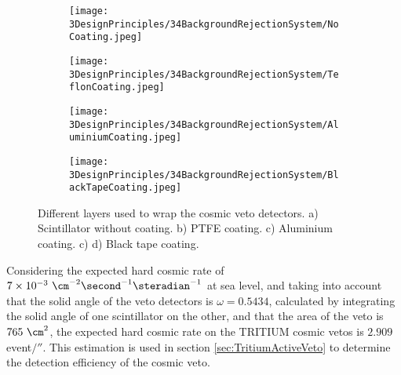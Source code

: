 \begin{figure}[h]
\centering
    \begin{subfigure}[b]{0.23\textwidth}
    \centering
    \texttt{[image: 3DesignPrinciples/34BackgroundRejectionSystem/NoCoating.jpeg]}  
    \caption{\label{subfig:PlasticScintillatorNoCoating}}
    \end{subfigure}
    \hfill
    \begin{subfigure}[b]{0.23\textwidth}
    \centering
    \texttt{[image: 3DesignPrinciples/34BackgroundRejectionSystem/TeflonCoating.jpeg]}  
    \caption{\label{subfig:PlasticScintillatorTeflon}}
    \end{subfigure}
    \hfill
    \begin{subfigure}[b]{0.23\textwidth}
    \centering
    \texttt{[image: 3DesignPrinciples/34BackgroundRejectionSystem/AluminiumCoating.jpeg]}  
    \caption{\label{subfig:PlasticScintillatorAluminium}}
    \end{subfigure}
    \hfill
    \begin{subfigure}[b]{0.23\textwidth}
    \centering
    \texttt{[image: 3DesignPrinciples/34BackgroundRejectionSystem/BlackTapeCoating.jpeg]}  
    \caption{\label{subfig:PlasticScintillatorBlackTape}}
    \end{subfigure}
 \caption{Different layers used to wrap the cosmic veto detectors. a) Scintillator without coating. b) PTFE coating. c) Aluminium coating. c) d) Black tape coating.}
 \label{fig:LayersVeto}
\end{figure}

Considering the expected hard cosmic rate of $7 \times 10^{-3}~\cm^{-2}\second^{-1}\steradian^{-1}$ at sea level, and taking into account that the solid angle of the veto detectors is $\omega=0.5434$, calculated by integrating the solid angle of one scintillator on the other, and that the area of the veto is $765~\cm^2$, the expected hard cosmic rate on the TRITIUM cosmic vetos is $2.909~$event$/\second$. This estimation is used in section \ref{sec:TritiumActiveVeto} to determine the detection efficiency of the cosmic veto.